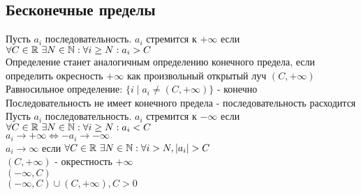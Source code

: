\subsection{Бесконечные пределы} 
Пусть $a_i$ последовательность.
$ a_i $ стремится к $ +\infty$ если $ \forall C \in \mathbb{R} \  \exists N \in \mathbb{N} : \forall i \geq N : a_i > C $ \\
Определение станет аналогичным определению конечного предела, если определить окресность $ +\infty $ как произвольный открытый луч $ (C, +\infty)$ \\
Равносильное определение: $ \{i \mid a_i \neq (C, +\infty) \} $ - конечно \\
Последовательность не имеет конечного предела - последовательность расходится \\
Пусть $a_i$ последовательность.
$ a_i $ стремится к $ -\infty$ если $ \forall C \in \mathbb{R} \  \exists N \in \mathbb{N} : \forall i \geq N : a_i < C $ \\
$ a_i \rightarrow +\infty \Leftrightarrow -a_i \rightarrow -\infty $\\
$ a_i \rightarrow \infty $ если $ \forall C \in \mathbb{R} \ \exists N \in \mathbb{N} : \forall i > N, |a_i| > C $ \\
$ ( C, +\infty )$ - окрестность $+\infty$ \\
$ (-\infty, C) $ \\
$ (-\infty, C) \cup ( C, +\infty), C > 0 $  \\

